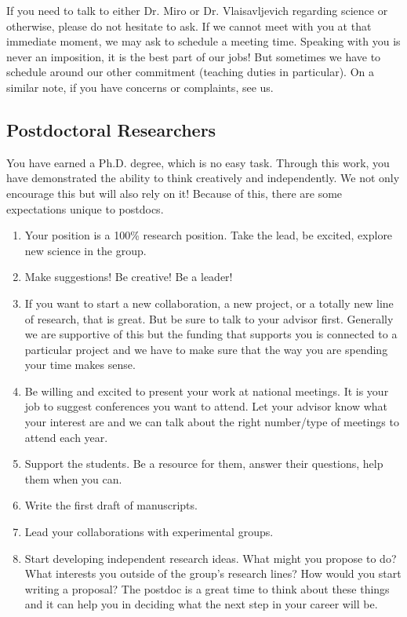 \documentclass[letterpaper]{article}
\begin{document}
If you need to talk to either Dr. Miro or Dr. Vlaisavljevich regarding science or otherwise, please do not hesitate to ask. If we cannot meet with you at that immediate moment, we may ask to schedule a meeting time. Speaking with you is never an imposition, it is the best part of our jobs! But sometimes we have to schedule around our other commitment (teaching duties in particular). On a similar note, if you have concerns or complaints, see us.

\subsection*{Postdoctoral Researchers}
You have earned a Ph.D. degree, which is no easy task. Through this work, you have demonstrated the ability to think creatively and independently. We not only encourage this but will also rely on it! Because of this, there are some expectations unique to postdocs. 

\begin{enumerate} 
\item Your position is a 100\% research position. Take the lead, be excited, explore new science in the group.
\item Make suggestions! Be creative! Be a leader!
\item If you want to start a new collaboration, a new project, or a totally new line of research, that is great. But be sure to talk to your advisor first. Generally we are supportive of this but the funding that supports you is connected to a particular project and we have to make sure that the way you are spending your time makes sense.
\item Be willing and excited to present your work at national meetings. It is your job to suggest conferences you want to attend. Let your advisor know what your interest are and we can talk about the right number/type of meetings to attend each year.
\item Support the students. Be a resource for them, answer their questions, help them when you can.
\item Write the first draft of manuscripts.
\item Lead your collaborations with experimental groups.
\item Start developing independent research ideas. What might you propose to do? What interests you outside of the group's research lines? How would you start writing a proposal? The postdoc is a great time to think about these things and it can help you in deciding what the next step in your career will be. 
\end{enumerate}
\end{document}
